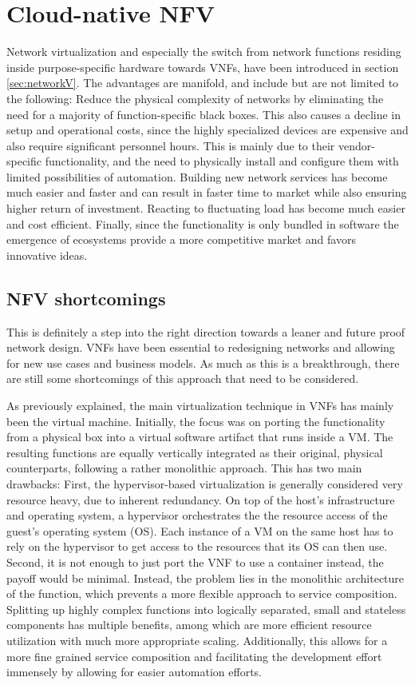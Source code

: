 \section{Cloud-native NFV}
Network virtualization and especially the switch from network functions residing inside purpose-specific hardware towards VNFs, have been introduced in section \ref{sec:networkV}. The advantages are manifold, and include but are not limited to the following: Reduce the physical complexity of networks by eliminating the need for a majority of function-specific black boxes. This also causes a decline in setup and operational costs, since the highly specialized devices are expensive and also require significant personnel hours. This is mainly due to their vendor-specific functionality, and the need to physically install and configure them with limited possibilities of automation. Building new network services has become much easier and faster and can result in faster time to market while also ensuring higher return of investment. Reacting to fluctuating load has become much easier and cost efficient. Finally, since the functionality is only bundled in software the emergence of ecosystems provide a more competitive market and favors innovative ideas.

\subsection{NFV shortcomings}
This is definitely a step into the right direction towards a leaner and future proof network design. VNFs have been essential to redesigning networks and allowing for new use cases and business models. As much as this is a breakthrough, there are still some shortcomings of this approach that need to be considered. 

As previously explained, the main virtualization technique in VNFs has mainly been the virtual machine. Initially, the focus was on porting the functionality from a physical box into a virtual software artifact that runs inside a VM. The resulting functions are equally vertically integrated as their original, physical counterparts, following a rather monolithic approach. This has two main drawbacks:
First, the hypervisor-based virtualization is generally considered very resource heavy, due to inherent redundancy. On top of the host's infrastructure and operating system, a hypervisor orchestrates the the resource access of the guest's operating system (OS). Each instance of a VM on the same host has to rely on the hypervisor to get access to the resources that its OS can then use. 
Second, it is not enough to just port the VNF to use a container instead, the payoff would be minimal. Instead, the problem lies in the monolithic architecture of the function, which prevents a more flexible approach to service composition. Splitting up highly complex functions into logically separated, small and stateless components has multiple benefits, among which are more efficient resource utilization with much more appropriate scaling. Additionally, this allows for a more fine grained service composition and facilitating the development effort immensely by allowing for easier automation efforts. 

